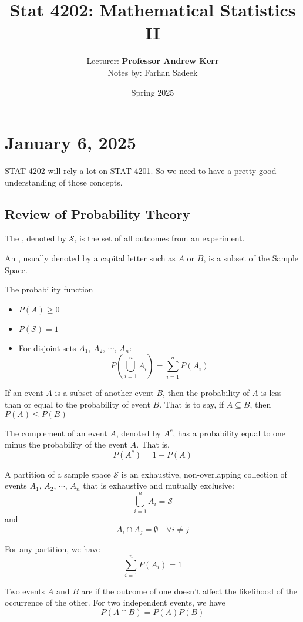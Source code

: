 \documentclass[11pt]{article}
\title{Stat 4202: Mathematical Statistics II}
\author{Lecturer: \textbf{Professor Andrew Kerr}\\Notes by: Farhan Sadeek}
\date{Spring 2025}
\begin{document}
\maketitle
\section{January 6, 2025}
STAT 4202 will rely a lot on STAT 4201. So we need to have a pretty good
understanding of those concepts.

\subsection{Review of Probability Theory}
\begin{definition}
    The , denoted by $\mathcal{S}$, is the set of all outcomes from an experiment.
\end{definition}

\begin{definition}
    An , usually denoted by a capital letter such as $A$ or $B$, is a subset of the Sample Space.
\end{definition}

The probability function
\begin{itemize}
    \item $P(A) \geq 0$
    \item $P(\mathcal{S}) = 1$
    \item For disjoint sets $A_1$, $A_2$, $\cdots$, $A_n$: \[ P\left(\bigcup_{i = 1}^{n}A_i \right) = \sum_{i = 1}^{n} P(A_i)\]
\end{itemize}

If an event $A$ is a subset of another event $B$, then the probability of $A$
is less than or equal to the probability of event $B$. That is to say, if $A
    \subseteq B$, then \( P(A) \leq P(B)\)

The complement of an event $A$, denoted by $A^c$, has a probability equal to
one minus the probability of the event $A$. That is,
\[ P(A^c) = 1 - P(A) \]

A partition of a sample space $\mathcal{S}$ is an exhaustive, non-overlapping
collection of events $A_1$, $A_2$, $\cdots$, $A_n$ that is exhaustive and
mutually exclusive: \[\bigcup_{i=1}^{n} A_i = \mathcal{S}\] and \[A_i \cap A_j = \emptyset \quad \forall i \neq j\]

For any partition, we have \[\sum_{i=1}^{n} P(A_i) = 1\]

Two events $A$ and $B$ are  if the outcome of one doesn't
affect the likelihood of the occurrence of the other. For two independent
events, we have \[P(A \cap B) = P(A)P(B)\]
\end{document}
